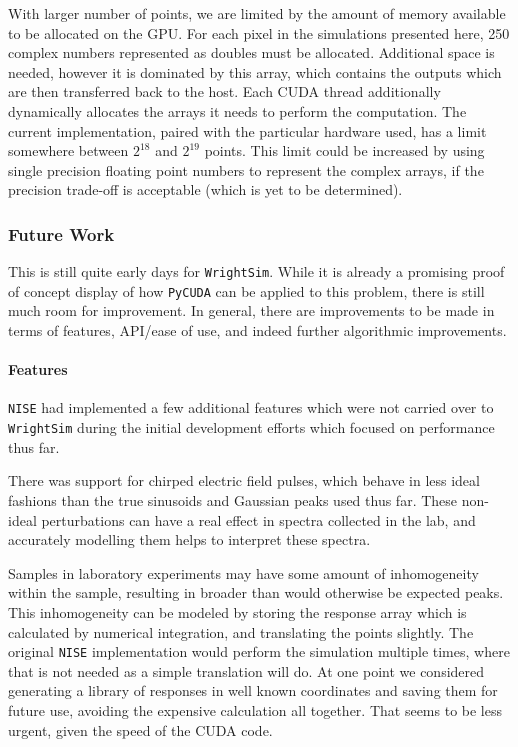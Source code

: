 With larger number of points, we are limited by the amount of memory
available to be allocated on the GPU. For each pixel in the simulations
presented here, 250 complex numbers represented as doubles must be
allocated. Additional space is needed, however it is dominated by this
array, which contains the outputs which are then transferred back to the
host. Each CUDA thread additionally dynamically allocates the arrays it
needs to perform the computation. The current implementation, paired
with the particular hardware used, has a limit somewhere between
\(2^{18}\) and \(2^{19}\) points. This limit could be increased by using
single precision floating point numbers to represent the complex arrays,
if the precision trade-off is acceptable (which is yet to be
determined).

\hypertarget{future-work}{%
\subsubsection{Future Work}\label{future-work}}

This is still quite early days for \texttt{WrightSim}. While it is
already a promising proof of concept display of how \texttt{PyCUDA} can
be applied to this problem, there is still much room for improvement. In
general, there are improvements to be made in terms of features,
API/ease of use, and indeed further algorithmic improvements.

\hypertarget{features}{%
\paragraph{Features}\label{features}}

\texttt{NISE} had implemented a few additional features which were not
carried over to \texttt{WrightSim} during the initial development
efforts which focused on performance thus far.

There was support for chirped electric field pulses, which behave in
less ideal fashions than the true sinusoids and Gaussian peaks used thus
far. These non-ideal perturbations can have a real effect in spectra
collected in the lab, and accurately modelling them helps to interpret
these spectra.

Samples in laboratory experiments may have some amount of inhomogeneity
within the sample, resulting in broader than would otherwise be expected
peaks. This inhomogeneity can be modeled by storing the response array
which is calculated by numerical integration, and translating the points
slightly. The original \texttt{NISE} implementation would perform the
simulation multiple times, where that is not needed as a simple
translation will do. At one point we considered generating a library of
responses in well known coordinates and saving them for future use,
avoiding the expensive calculation all together. That seems to be less
urgent, given the speed of the CUDA code.

